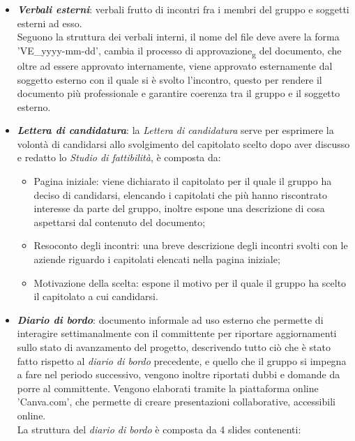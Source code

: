         \begin{itemize}
            \item \textit{\textbf{Verbali esterni}}: verbali frutto di incontri fra i membri del gruppo e soggetti esterni ad esso.\\
            Seguono la struttura dei verbali interni, il nome del file deve avere la forma 'VE\_yyyy-mm-dd', cambia il processo di approvazione\textsubscript{g} del documento, che oltre ad essere approvato internamente, viene approvato esternamente dal soggetto esterno con il quale 
            si è svolto l'incontro, questo per rendere il documento più professionale e garantire coerenza tra il gruppo e il soggetto esterno.
            \item \textit{\textbf{Lettera di candidatura}}: la \textit{Lettera di candidatura} serve per esprimere la volontà di candidarsi allo svolgimento del capitolato scelto dopo aver discusso e redatto lo \textit{Studio di fattibilità}, 
            è composta da:
            \begin{itemize}
                \item Pagina iniziale: viene dichiarato il capitolato per il quale il gruppo ha deciso di candidarsi, elencando i capitolati che più hanno riscontrato interesse da parte del gruppo, 
                inoltre espone una descrizione di cosa aspettarsi dal contenuto del documento;
                \item Resoconto degli incontri: una breve descrizione degli incontri svolti con le aziende riguardo i capitolati elencati nella pagina iniziale;
                \item Motivazione della scelta: espone il motivo per il quale il gruppo ha scelto il capitolato a cui candidarsi.
            \end{itemize}
            \item \textit{\textbf{Diario di bordo}}: documento informale ad uso esterno che permette di interagire settimanalmente con il committente per riportare aggiornamenti sullo stato di avanzamento del progetto, descrivendo tutto ciò che è stato fatto rispetto al \textit{diario di bordo} precedente, 
            e quello che il gruppo si impegna a fare nel periodo successivo, vengono inoltre riportati dubbi e domande da porre al committente.
            Vengono elaborati tramite la piattaforma online 'Canva.com', che permette di creare presentazioni collaborative, accessibili online.\\ 
            La struttura del \textit{diario di bordo} è composta da 4 slides contenenti:

\end{itemize}
